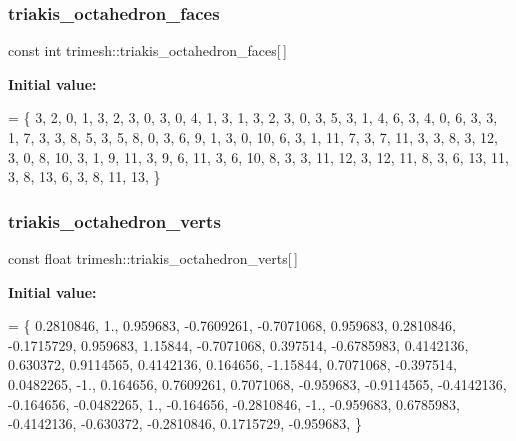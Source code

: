 \mbox{\label{namespacetrimesh_a7b78f51d30d6a934ea05eb3abda3dcb1}} 
\subsubsection{\texorpdfstring{triakis\+\_\+octahedron\+\_\+faces}{triakis\_octahedron\_faces}}
{\footnotesize\ttfamily const int trimesh\+::triakis\+\_\+octahedron\+\_\+faces\mbox{[}$\,$\mbox{]}\hspace{0.3cm}{\ttfamily [static]}}

{\bfseries Initial value\+:}
\begin{DoxyCode}
= \{
    3, 2, 0, 1,
    3, 2, 3, 0,
    3, 0, 4, 1,
    3, 1, 3, 2,
    3, 0, 3, 5,
    3, 1, 4, 6,
    3, 4, 0, 6,
    3, 3, 1, 7,
    3, 3, 8, 5,
    3, 5, 8, 0,
    3, 6, 9, 1,
    3, 0, 10, 6,
    3, 1, 11, 7,
    3, 7, 11, 3,
    3, 8, 3, 12,
    3, 0, 8, 10,
    3, 1, 9, 11,
    3, 9, 6, 11,
    3, 6, 10, 8,
    3, 3, 11, 12,
    3, 12, 11, 8,
    3, 6, 13, 11,
    3, 8, 13, 6,
    3, 8, 11, 13,
\}
\end{DoxyCode}
\mbox{\label{namespacetrimesh_a58c4b3efff7c339b1ee7d79ec449539b}} 
\subsubsection{\texorpdfstring{triakis\+\_\+octahedron\+\_\+verts}{triakis\_octahedron\_verts}}
{\footnotesize\ttfamily const float trimesh\+::triakis\+\_\+octahedron\+\_\+verts\mbox{[}$\,$\mbox{]}\hspace{0.3cm}{\ttfamily [static]}}

{\bfseries Initial value\+:}
\begin{DoxyCode}
= \{
    0.2810846, 1., 0.959683,
    -0.7609261, -0.7071068, 0.959683,
    0.2810846, -0.1715729, 0.959683,
    1.15844, -0.7071068, 0.397514,
    -0.6785983, 0.4142136, 0.630372,
    0.9114565, 0.4142136, 0.164656,
    -1.15844, 0.7071068, -0.397514,
    0.0482265, -1., 0.164656,
    0.7609261, 0.7071068, -0.959683,
    -0.9114565, -0.4142136, -0.164656,
    -0.0482265, 1., -0.164656,
    -0.2810846, -1., -0.959683,
    0.6785983, -0.4142136, -0.630372,
    -0.2810846, 0.1715729, -0.959683,
\}
\end{DoxyCode}
\mbox{\label{namespacetrimesh_a069844dcbe1fa3d9a3b717ab89adfbad}} 
